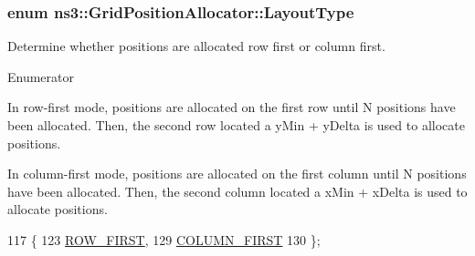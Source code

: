 \subsubsection[{\texorpdfstring{Layout\+Type}{LayoutType}}]{\setlength{\rightskip}{0pt plus 5cm}enum {\bf ns3\+::\+Grid\+Position\+Allocator\+::\+Layout\+Type}}\hypertarget{classns3_1_1GridPositionAllocator_a31cab553ee810e780d5dce3ed4336b15}{}\label{classns3_1_1GridPositionAllocator_a31cab553ee810e780d5dce3ed4336b15}
Determine whether positions are allocated row first or column first. \begin{Desc}
\item[Enumerator]\par
\begin{description}
\item[{\em 
R\+O\+W\+\_\+\+F\+I\+R\+ST\hypertarget{classns3_1_1GridPositionAllocator_a31cab553ee810e780d5dce3ed4336b15ae2c3a68ac2b72dfc65ed3e7422e57fc9}{}\label{classns3_1_1GridPositionAllocator_a31cab553ee810e780d5dce3ed4336b15ae2c3a68ac2b72dfc65ed3e7422e57fc9}
}]In row-\/first mode, positions are allocated on the first row until N positions have been allocated. Then, the second row located a y\+Min + y\+Delta is used to allocate positions. \item[{\em 
C\+O\+L\+U\+M\+N\+\_\+\+F\+I\+R\+ST\hypertarget{classns3_1_1GridPositionAllocator_a31cab553ee810e780d5dce3ed4336b15a8dab5860b0cb60386bed383efccb8389}{}\label{classns3_1_1GridPositionAllocator_a31cab553ee810e780d5dce3ed4336b15a8dab5860b0cb60386bed383efccb8389}
}]In column-\/first mode, positions are allocated on the first column until N positions have been allocated. Then, the second column located a x\+Min + x\+Delta is used to allocate positions. \end{description}
\end{Desc}

\begin{DoxyCode}
117                   \{
123     \hyperlink{classns3_1_1GridPositionAllocator_a31cab553ee810e780d5dce3ed4336b15ae2c3a68ac2b72dfc65ed3e7422e57fc9}{ROW\_FIRST},
129     \hyperlink{classns3_1_1GridPositionAllocator_a31cab553ee810e780d5dce3ed4336b15a8dab5860b0cb60386bed383efccb8389}{COLUMN\_FIRST}
130   \};
\end{DoxyCode}


